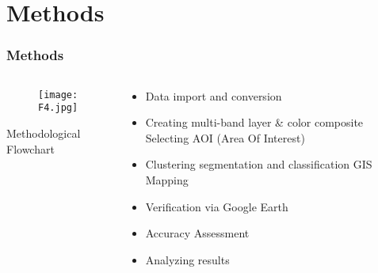 \documentclass[pdflatex,compress,8pt,
	xcolor={dvipsnames,dvipsnames,svgnames,x11names,table},
	hyperref={
	breaklinks = true, 
	pdfauthor={Lemenkova Polina}, 
	pdfsubject={Preentation}, 
	pdfcreator={Lemenkova Polina}, 
	pdfproducer={Lemenkova Polina}, 
	citecolor=NavyBlue, 
	urlbordercolor=cyan,
	urlcolor = NavyBlue, 
	breaklinks = true}]{beamer}
\begin{document}
\section{Methods} 
\begin{frame}\frametitle{Methods}
\begin{minipage}[0.4\textheight]{\textwidth}
\begin{columns}[T]
\begin{column}{0.5\textwidth}
\vspace{2em}
\begin{figure}[H]
	\centering
		\texttt{[image: F4.jpg]}
\end{figure}
\footnotesize{Methodological Flowchart}
\end{column}
\begin{column}{0.5\textwidth}
\vspace{2em}  
\begin{itemize}
	\item Data import and conversion
	\item Creating multi-band layer \& color composite Selecting AOI (Area Of Interest)
	\item Clustering segmentation and classification GIS Mapping
	\item Verification via Google Earth
	\item Accuracy Assessment
	\item Analyzing results
\end{itemize}
\end{column}
\end{columns}
\end{minipage}
\end{frame}
\end{document}
